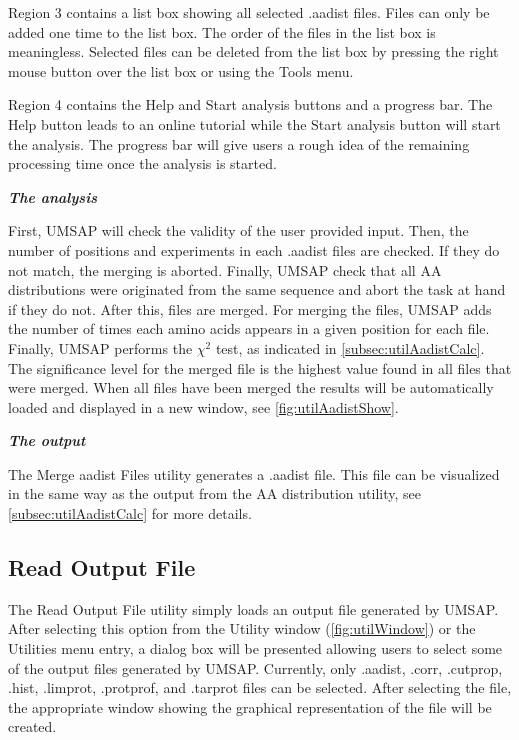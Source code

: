 Region \num{3} contains a list box showing all selected .aadist files. Files can only be added one time to the list box. The order of the files in the list box is meaningless. Selected files can be deleted from the list box by pressing the right mouse button over the list box or using the Tools menu. 

Region \num{4} contains the Help and Start analysis buttons and a progress bar. The Help button leads to an online tutorial while the Start analysis button will start the analysis. The progress bar will give users a rough idea of the remaining processing time once the analysis is started.

\textit{\textbf{The analysis}}

First, UMSAP will check the validity of the user provided input. Then, the number of positions and experiments in each .aadist files are checked. If they do not match, the merging is aborted. Finally, UMSAP check that all AA distributions were originated from the same sequence and abort the task at hand if they do not. After this, files are merged. For merging the files, UMSAP adds the number of times each amino acids appears in a given position for each file. Finally, UMSAP performs the $\chi^2$ test, as indicated in \autoref{subsec:utilAadistCalc}. The significance level for the merged file is the highest value found in all files that were merged. When all files have been merged the results will be automatically loaded and displayed in a new window, see \autoref{fig:utilAadistShow}. 

\textit{\textbf{The output}} 

The Merge aadist Files utility generates a .aadist file. This file can be visualized in the same way as the output from the AA distribution utility, see \autoref{subsec:utilAadistCalc} for more details.

\subsection{Read Output File}
\label{subsec:utilReadOutF}

The Read Output File utility simply loads an output file generated by UMSAP. After selecting this option from the Utility window (\autoref{fig:utilWindow}) or the Utilities menu entry, a dialog box will be presented allowing users to select some of the output files generated by UMSAP. Currently, only .aadist, .corr, .cutprop, .hist, .limprot, .protprof, and .tarprot files can be selected. After selecting the file, the appropriate window showing the graphical representation of the file will be created. 

